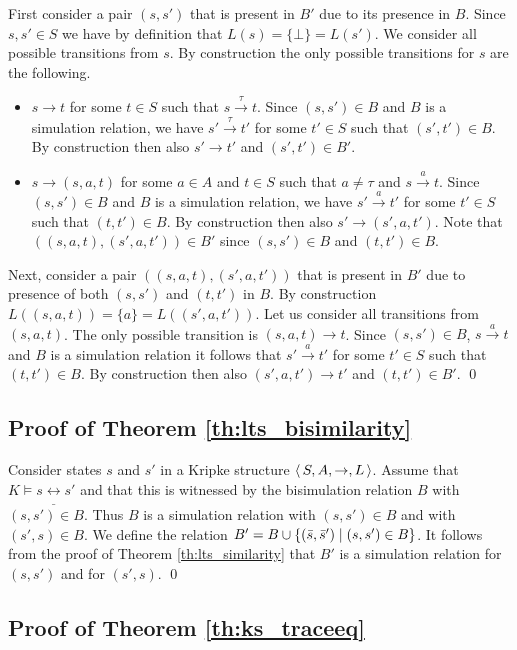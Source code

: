 \documentclass{llncs}
\newcommand{\ltstrans}[1]{\xrightarrow{#1}}
\newcommand{\kstrans}{\to}
\newcommand{\bisim}{\mbox{$\underline{\leftrightarrow}$}}
\begin{document}
First consider a pair $(s,s')$ that is present in $B'$ due to its presence in $B$. Since $s,s'\in S$ we have by definition that $L(s) = \{\bot\} = L(s')$.
We consider all possible transitions from $s$. By construction the only possible transitions for $s$ are the following.

\begin{itemize}
\item $s \kstrans t$ for some $t \in S$ such that $s \ltstrans{\tau} t$. Since $(s,s') \in B$ and $B$ is a simulation relation, we have $s' \ltstrans{\tau} t'$ for some $t' \in S$ such that $(s',t') \in B$. By construction then also $s' \kstrans t'$ and $(s',t') \in B'$.
\item $s \kstrans (s,a,t)$ for some $a \in A$ and $t \in S$ such that $a \neq \tau$ and $s \ltstrans{a} t$. Since $(s,s') \in B$ and $B$ is a simulation relation, we have $s' \ltstrans{a} t'$ for some $t' \in S$ such that $(t,t') \in B$. By construction then also $s' \kstrans (s',a,t')$. Note that $((s,a,t),(s',a,t')) \in B'$ since $(s,s') \in B$ and $(t,t')\in B$.
\end{itemize}


Next, consider a pair $((s,a,t),(s',a,t'))$ that is present in $B'$ due to presence of both $(s,s')$ and $(t,t')$ in $B$. By construction $L((s,a,t)) = \{ a \} = L((s',a,t'))$. Let us consider all transitions from $(s,a,t)$.
The only possible transition is $(s,a,t) \kstrans t$. Since $(s,s') \in B$, $s \ltstrans{a} t$ and $B$ is a simulation relation it follows that $s' \ltstrans{a} t'$ for some $t' \in S$ such that $(t,t') \in B$. By construction then also $(s',a,t') \kstrans t'$ and $(t,t') \in B'$. \qed


\subsection{Proof of Theorem \ref{th:lts_bisimilarity}}
\label{pf:th:lts_bisimilarity}

Consider states $s$ and $s'$ in a Kripke structure $\tuple{S,A,\kstrans,L}$. Assume that $K \models s \bisim s'$ and that this is witnessed by the bisimulation relation $B$ with $(s,s') \in B$. Thus $B$ is a simulation relation with $(s,s') \in B$ and with $(s',s) \in B$.
We define the relation $B' = B \cup \{ (\bar{s},\bar{s}') \mid (s,s') \in B \}$. It follows from the proof of Theorem \ref{th:lts_similarity} that $B'$ is a simulation relation for $(s,s')$ and for $(s',s)$. \qed

\subsection{Proof of Theorem \ref{th:ks_traceeq}}
\label{pf:th:ks_traceeq}
\end{document}
